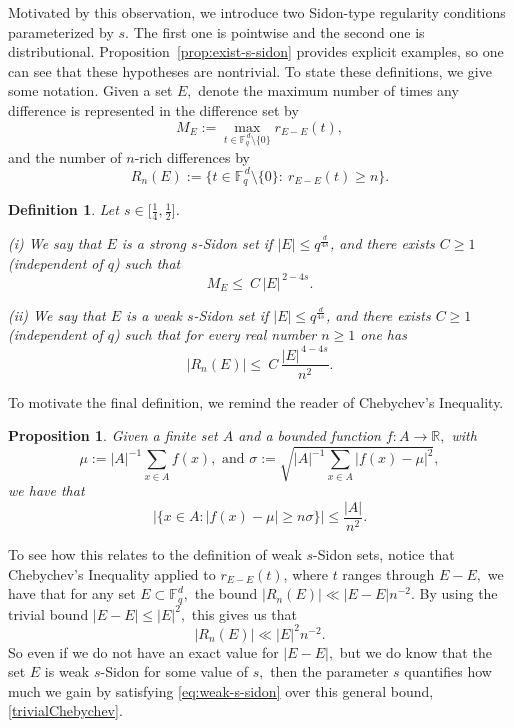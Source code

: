 \documentclass{article}
\newtheorem{proposition}[theorem]{Proposition}
\newtheorem{definition}[theorem]{Definition}
\begin{document}
Motivated by this observation, we introduce two Sidon-type regularity conditions parameterized by $s$.
The first one is pointwise and the second one is distributional. Proposition~\ref{prop:exist-s-sidon} provides explicit examples, so one can see that these hypotheses are nontrivial. To state these definitions, we give some notation. Given a set $E,$ denote the maximum number of times any difference is represented in the difference set by 
\[M_E:=\max_{t\in \mathbb{F}_q^{\,d}\setminus\{0\}} r_{E-E}(t),\]
and the number of $n$-rich differences by
\[R_n(E):=\{t\in \mathbb{F}_q^{\,d}\setminus\{0\}:\ r_{E-E}(t)\ge n\}.\]



\begin{definition}\label{def:s-sidon}
Let $s\in \big[\frac{1}{4},\frac12\big]$.

\smallskip
\noindent
(i) We say that $E$ is a \emph{strong $s$-Sidon set} if $|E|\le q^{\frac{d}{4s}}$, and there exists $C\ge 1$ (independent of $q$) such that
\begin{equation}\label{eq:strong-s-sidon}
M_E \le\ C\,|E|^{\,2-4s}.
\end{equation}

\smallskip
\noindent
(ii)  We say that $E$ is a \emph{weak $s$-Sidon set} if $|E|\le q^{\frac{d}{4s}}$, and there exists $C\ge 1$ (independent of $q$) such that for every real number $n\ge 1$ one has
\begin{equation}\label{eq:weak-s-sidon}
|R_n(E)|\le\ C\,\frac{|E|^{\,4-4s}}{n^{2}}.
\end{equation}
\end{definition}


To motivate the final definition, we remind the reader of Chebychev's Inequality.
\begin{proposition}\label{chebychev}
Given a finite set $A$ and a bounded function $f:A\rightarrow \mathbb R,$ with
\[\mu := |A|^{-1}\sum_{x\in A}f(x), \text{ and } \sigma := \sqrt{|A|^{-1}\sum_{x\in A} |f(x)-\mu|^2},\]
we have that
\[|\{x\in A: |f(x)-\mu|\geq n\sigma\}|\leq \frac{|A|}{n^2}.\]
\end{proposition}

To see how this relates to the definition of weak $s$-Sidon sets, notice that Chebychev's Inequality applied to $r_{E-E}(t)$, where $t$ ranges through $E-E,$ we have that for any set $E\subset \mathbb F_q^d,$ the bound $|R_n(E)|\ll |E-E|n^{-2}.$ By using the trivial bound $|E-E|\leq |E|^2,$ this gives us that
\begin{equation}\label{trivialChebychev}
    |R_n(E)|\ll |E|^2n^{-2}.
\end{equation}
So even if we do not have an exact value for $|E-E|,$ but we do know that the set $E$ is weak $s$-Sidon for some value of $s,$ then the parameter $s$ quantifies how much we gain by satisfying \eqref{eq:weak-s-sidon} over this general bound, \eqref{trivialChebychev}.
\end{document}
